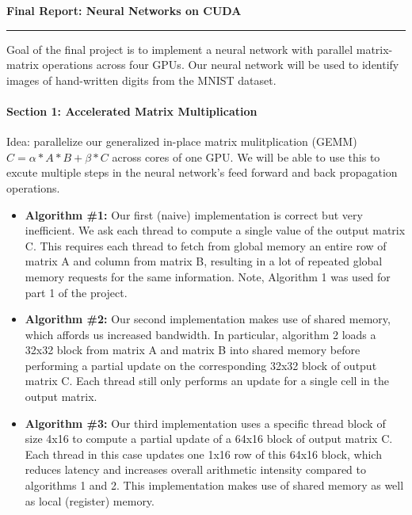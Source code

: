 \documentclass[12pt,letterpaper,twoside]{article}
\begin{document}
{\centering \textbf{Final Report: Neural Networks on CUDA\\}}
\vspace*{-8pt}\noindent\rule{\linewidth}{1pt}

Goal of the final project is to implement a neural network with parallel 
matrix-matrix operations across four GPUs. Our neural network will be used
to identify images of hand-written digits from the MNIST dataset.

\paragraph{Section 1: Accelerated Matrix Multiplication} Idea: parallelize our generalized
in-place matrix mulitplication (GEMM) $C = \alpha*A*B + \beta*C$ across cores of one GPU. We 
will be able to use this to excute multiple steps in the neural network's feed forward 
and back propagation operations.

\begin{itemize}
    \item \textbf{Algorithm \#1:} Our first (naive) implementation is correct but 
    very inefficient. We ask each thread to compute a single value of the output matrix 
    C. This requires each thread to fetch from global memory an entire row of matrix A 
    and column from matrix B, resulting in a lot of repeated global memory requests 
    for the same information. Note, Algorithm 1 was used for part 1 of the project.

    \item \textbf{Algorithm \#2:} Our second implementation makes use of shared 
    memory, which affords us increased bandwidth. In particular, algorithm 2 
    loads a 32x32 block from matrix A and matrix B into shared memory before
    performing a partial update on the corresponding 32x32 block of output
    matrix C. Each thread still only performs an update for a single cell 
    in the output matrix.  

    \item \textbf{Algorithm \#3: } Our third implementation uses a specific 
    thread block of size 4x16 to compute a partial update of a 64x16 block of 
    output matrix C. Each thread in this case updates one 1x16 row of this
    64x16 block, which reduces latency and increases overall arithmetic intensity 
    compared to algorithms 1 and 2. This implementation makes use of shared memory 
    as well as local (register) memory.  

\end{itemize}
\end{document}
